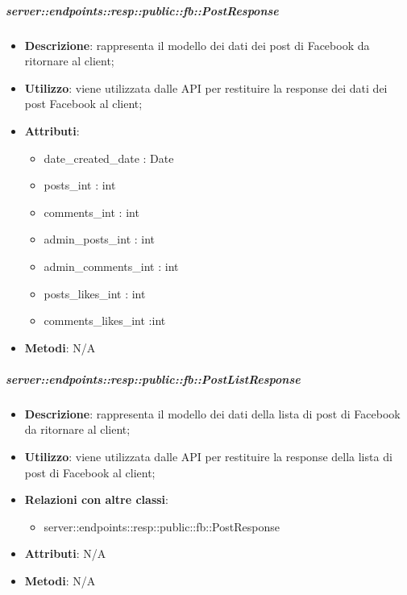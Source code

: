     \subparagraph{server::endpoints::resp::public::fb::PostResponse} %
    \label{subp:bdsm_app_server_endpoints_resp_public_fb_postresponse}
    \begin{itemize}
      \item \textbf{Descrizione}: rappresenta il modello dei dati dei post di Facebook da ritornare al client;
      \item \textbf{Utilizzo}: viene utilizzata dalle API per restituire la response dei dati dei post Facebook al client;
      
	  \item \textbf{Attributi}:  
	  	\begin{itemize}
	  		\item date\_created\_date : Date
	  		\item posts\_int : int
	  		\item comments\_int : int
	  		\item admin\_posts\_int : int
	  		\item admin\_comments\_int : int
	  		\item posts\_likes\_int : int
	  		\item comments\_likes\_int :int
	  	\end{itemize}
	  \item \textbf{Metodi}: N/A
    \end{itemize}

    \subparagraph{server::endpoints::resp::public::fb::PostListResponse} %
    \label{subp:bdsm_app_server_endpoints_resp_public_fb_postlistresponse}
    \begin{itemize}
      \item \textbf{Descrizione}: rappresenta il modello dei dati della lista di post di Facebook da ritornare al client;
      \item \textbf{Utilizzo}: viene utilizzata dalle API per restituire la response della lista di post di Facebook al client;
      \item \textbf{Relazioni con altre classi}:
        \begin{itemize}
          \item server::endpoints::resp::public::fb::PostResponse
        \end{itemize}
	  \item \textbf{Attributi}: N/A
	  \item \textbf{Metodi}: N/A
      \end{itemize}

